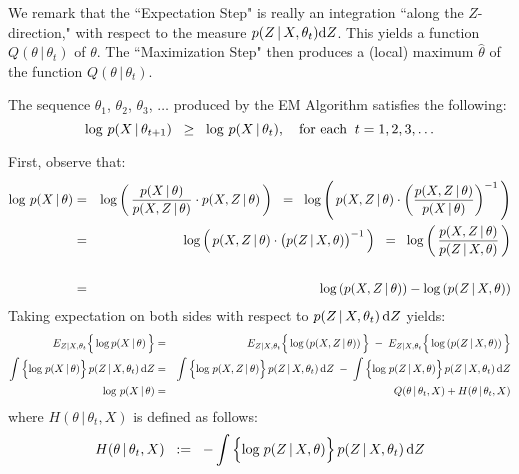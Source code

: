 \begin{remark}\quad
We remark that the ``Expectation Step" is really an integration ``along the $Z$-direction,"
with respect to the measure $p(Z\,|\,X,\theta_{t})\textnormal{d}Z$.
This yields a function $Q(\theta\,|\,\theta_{t})$ of $\theta$.
The ``Maximization Step" then produces a (local) maximum $\widehat{\theta}$ of the function
$Q(\theta\,|\,\theta_{t})$.
\end{remark}
\begin{theorem}\quad
The sequence $\theta_{1}$, $\theta_{2}$, $\theta_{3}$, $\ldots$ produced by the EM Algorithm
satisfies the following:
\begin{equation*}
\log\,p(X\,|\,\theta_{t+1}) \;\; \geq \;\; \log\,p(X\,|\,\theta_{t}),
\quad
\textnormal{for each}\;\;t = 1, 2, 3, \ldots
\end{equation*}
\end{theorem}
\proof First, observe that:
\begin{eqnarray*}
\log\,p(X\,|\,\theta)
& = &
	\log\left(\,\dfrac{p(X\,\vert\,\theta)}{p(X,Z\,\vert\,\theta)} \cdot p(X,Z\,\vert\,\theta)\,\right)
\;\;=\;\;
	\log\left(\,p(X,Z\,\vert\,\theta) \cdot \left(\dfrac{p(X,Z\,\vert\,\theta)}{p(X\,\vert\,\theta)}\right)^{-1} \,\right)
\\
&=&
	\log\left(\,p(X,Z\,\vert\,\theta) \cdot \left(\overset{{\color{white}.}}{p}(Z\,\vert\,X,\theta)\right)^{-1} \,\right)
\;\;=\;\;
	\log\left(\,\dfrac{p(X,Z\,\vert\,\theta)}{p(Z\,\vert\,X,\theta)}\,\right)
\\
&&
\\
& = &
	\log\left(p(X,Z\,|\,\theta)\right) - \log\left(p(Z\,|\,X,\theta)\right)
\end{eqnarray*}
Taking expectation on both sides with respect to $p(Z\,|\,X,\theta_{t})\,\textnormal{d}Z$ yields:
\begin{eqnarray*}
E_{Z|X,\theta_{t}}\!\left\{\,\overset{{\color{white}.}}{\log}\,p(X\,|\,\theta)\,\right\}
& = &
E_{Z|X,\theta_{t}}\!\left\{\,\overset{{\color{white}.}}{\log}\left(p(X,Z\,|\,\theta)\right)\,\right\}
\;-\;
E_{Z|X,\theta_{t}}\!\left\{\,\overset{{\color{white}.}}{\log}\left(p(Z\,|\,X,\theta)\right)\,\right\}
\\
\int\left\{\overset{{\color{white}.}}{\log}\;p(X\,|\,\theta)\right\}p(Z\,|\,X,\theta_{t})\,\textnormal{d}Z
& = &
\int\left\{\overset{{\color{white}.}}{\log}\;p(X,Z\,|\,\theta)\right\}p(Z\,|\,X,\theta_{t})\,\textnormal{d}Z
\;-\;
\int\left\{\overset{{\color{white}.}}{\log}\;p(Z\,|\,X,\theta)\right\}p(Z\,|\,X,\theta_{t})\,\textnormal{d}Z
\\
\log\,p(X\,|\,\theta)
& = &
Q(\theta\,|\,\theta_{t},X) + H(\theta\,|\,\theta_{t},X)
\end{eqnarray*}
where $H(\theta\,|\,\theta_{t},X)$ is defined as follows:
\begin{equation*}
H(\theta\,|\,\theta_{t},X)
\;\; := \;\;
- \int\left\{\overset{{\color{white}.}}{\log}\;p(Z\,|\,X,\theta)\right\}p(Z\,|\,X,\theta_{t})\,\textnormal{d}Z
\end{equation*}

